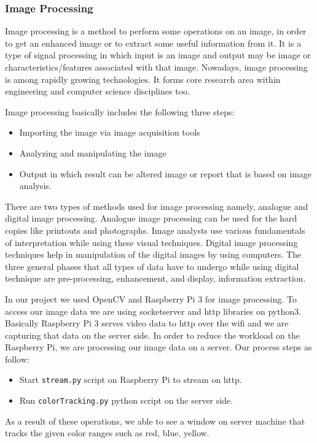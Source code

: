 \documentclass[12pt,a4paper]{article}
\begin{document}
\subsubsection{Image Processing}
Image processing is a method to perform some operations on an image, in order to get an enhanced image or to extract some useful 
information from it. It is a type of signal processing in which input is an image and output may be image or characteristics/features 
associated with that image. Nowadays, image processing is among rapidly growing technologies. It forms core research area within engineering 
and computer science disciplines too.

Image processing basically includes the following three steps:
\begin{itemize}
 \item Importing the image via image acquisition tools
 \item Analyzing and manipulating the image
 \item Output in which result can be altered image or report that is based on image analysis.
\end{itemize}

There are two types of methods used for image processing namely, analogue and digital image processing. Analogue image processing can be 
used for the hard copies like printouts and photographs. Image analysts use various fundamentals of interpretation while using these visual 
techniques. Digital image processing techniques help in manipulation of the digital images by using computers. The three general phases that 
all types of data have to undergo while using digital technique are pre-processing, enhancement, and display, information extraction. 

In our project we used OpenCV and Raspberry Pi 3 for image processing. To access our image data we are using socketserver and http libraries on 
python3. Basically Raspberry Pi 3 serves video data to http over the wifi and we are capturing that data on the server side. In order to reduce 
the workload on the Raspberry Pi, we are processing our image data on a server. Our process steps as follow:
\begin{itemize}
 \item Start \verb|stream.py| script on Raspberry Pi to stream on http.
 \item Run \verb|colorTracking.py| python script on the server side.
\end{itemize}

As a result of these operations, we able to see a window on server machine that tracks the given color ranges such as red, blue, yellow.
\end{document}

